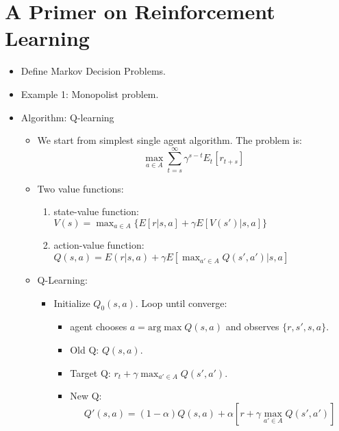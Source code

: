 \documentclass[11pt,english]{article}
\begin{document}
\section{A Primer on Reinforcement Learning}

\begin{itemize}
\item Define Markov Decision Problems.
\item Example 1: Monopolist problem.
\item Algorithm: Q-learning
\begin{itemize}
	\item We start from simplest single agent algorithm. The problem is: \medskip
	$$\underset{a \in A}{\max} \sum_{t=s}^{\infty} \gamma^{s-t} E_t[r_{t+s}]$$
	
	\item Two value functions: \medskip
	\begin{enumerate}
		\item state-value function: $V(s)=\max_{a\in A} \{E[r|s,a] + \gamma E[V(s')|s,a] \}$ \medskip
		\item action-value function: $Q(s,a)=E(r|s,a)+\gamma E[\max_{a'\in A} Q(s',a')|s,a]$ \medskip
	\end{enumerate}
	\item Q-Learning:  \medskip
	\begin{itemize}
		\item Initialize $Q_0(s,a)$. Loop until converge:  \medskip
		\begin{itemize}
			\item agent chooses $a= \text{arg} \max Q(s,a)$  and observes $\{r, s'  ,s, a\}$. \medskip
			\item Old Q: $Q(s,a)$. \medskip
			\item  Target Q: $r_t+\gamma \max_{a' \in A} Q(s',a')$. \medskip
			\item New Q: $$Q'(s,a)=(1-\alpha) Q(s,a) +\alpha [r+\gamma \max_{a' \in A} Q(s',a')]$$ \medskip
		\end{itemize}
	\end{itemize}
\end{itemize}


\end{itemize}
\end{document}
